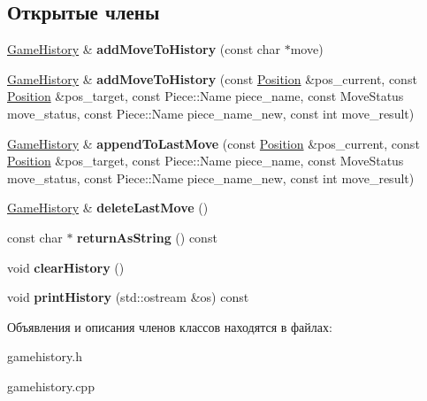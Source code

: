 \subsection*{Открытые члены}
\begin{DoxyCompactItemize}
\item 
\mbox{\label{class_chess_1_1_game_history_a04ae57210f35d767c974e5ef98756c3b}} 
\mbox{\hyperlink{class_chess_1_1_game_history}{Game\+History}} \& {\bfseries add\+Move\+To\+History} (const char $\ast$move)
\item 
\mbox{\label{class_chess_1_1_game_history_a6f9576ffb5086eb9706ea88e788cc0d6}} 
\mbox{\hyperlink{class_chess_1_1_game_history}{Game\+History}} \& {\bfseries add\+Move\+To\+History} (const \mbox{\hyperlink{class_chess_1_1_position}{Position}} \&pos\+\_\+current, const \mbox{\hyperlink{class_chess_1_1_position}{Position}} \&pos\+\_\+target, const Piece\+::\+Name piece\+\_\+name, const Move\+Status move\+\_\+status, const Piece\+::\+Name piece\+\_\+name\+\_\+new, const int move\+\_\+result)
\item 
\mbox{\label{class_chess_1_1_game_history_aafb9294b1c8cfdaad4603c900ddc00aa}} 
\mbox{\hyperlink{class_chess_1_1_game_history}{Game\+History}} \& {\bfseries append\+To\+Last\+Move} (const \mbox{\hyperlink{class_chess_1_1_position}{Position}} \&pos\+\_\+current, const \mbox{\hyperlink{class_chess_1_1_position}{Position}} \&pos\+\_\+target, const Piece\+::\+Name piece\+\_\+name, const Move\+Status move\+\_\+status, const Piece\+::\+Name piece\+\_\+name\+\_\+new, const int move\+\_\+result)
\item 
\mbox{\label{class_chess_1_1_game_history_ab774acd3d1b1fa6185e567d2fcebb41f}} 
\mbox{\hyperlink{class_chess_1_1_game_history}{Game\+History}} \& {\bfseries delete\+Last\+Move} ()
\item 
\mbox{\label{class_chess_1_1_game_history_ac55b4d4260cf19775c3263ef41b73500}} 
const char $\ast$ {\bfseries return\+As\+String} () const
\item 
\mbox{\label{class_chess_1_1_game_history_a4270ac251625e361794ac2f3ceb1dd1f}} 
void {\bfseries clear\+History} ()
\item 
\mbox{\label{class_chess_1_1_game_history_a3fb2cf5a5c699684da9e8cd1e2277c79}} 
void {\bfseries print\+History} (std\+::ostream \&os) const
\end{DoxyCompactItemize}


Объявления и описания членов классов находятся в файлах\+:\begin{DoxyCompactItemize}
\item 
gamehistory.\+h\item 
gamehistory.\+cpp\end{DoxyCompactItemize}
